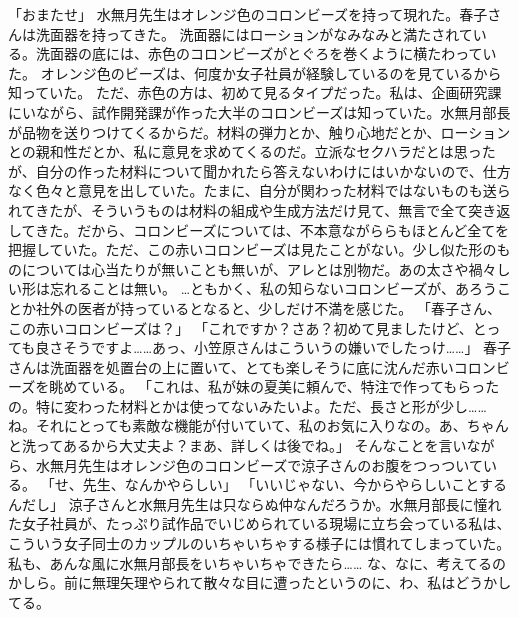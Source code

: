 「おまたせ」
水無月先生はオレンジ色のコロンビーズを持って現れた。春子さんは洗面器を持ってきた。
洗面器にはローションがなみなみと満たされている。洗面器の底には、赤色のコロンビーズがとぐろを巻くように横たわっていた。
オレンジ色のビーズは、何度か女子社員が経験しているのを見ているから知っていた。
ただ、赤色の方は、初めて見るタイプだった。私は、企画研究課にいながら、試作開発課が作った大半のコロンビーズは知っていた。水無月部長が品物を送りつけてくるからだ。材料の弾力とか、触り心地だとか、ローションとの親和性だとか、私に意見を求めてくるのだ。立派なセクハラだとは思ったが、自分の作った材料について聞かれたら答えないわけにはいかないので、仕方なく色々と意見を出していた。たまに、自分が関わった材料ではないものも送られてきたが、そういうものは材料の組成や生成方法だけ見て、無言で全て突き返してきた。だから、コロンビーズについては、不本意ながららもほとんど全てを把握していた。ただ、この赤いコロンビーズは見たことがない。少し似た形のものについては心当たりが無いことも無いが、アレとは別物だ。あの太さや禍々しい形は忘れることは無い。
…ともかく、私の知らないコロンビーズが、あろうことか社外の医者が持っているとなると、少しだけ不満を感じた。
「春子さん、この赤いコロンビーズは？」
「これですか？さあ？初めて見ましたけど、とっても良さそうですよ……あっ、小笠原さんはこういうの嫌いでしたっけ……」
春子さんは洗面器を処置台の上に置いて、とても楽しそうに底に沈んだ赤いコロンビーズを眺めている。
「これは、私が妹の夏美に頼んで、特注で作ってもらったの。特に変わった材料とかは使ってないみたいよ。ただ、長さと形が少し……ね。それにとっても素敵な機能が付いていて、私のお気に入りなの。あ、ちゃんと洗ってあるから大丈夫よ？まあ、詳しくは後でね。」
そんなことを言いながら、水無月先生はオレンジ色のコロンビーズで涼子さんのお腹をつっついている。
「せ、先生、なんかやらしい」
「いいじゃない、今からやらしいことするんだし」
涼子さんと水無月先生は只ならぬ仲なんだろうか。水無月部長に憧れた女子社員が、たっぷり試作品でいじめられている現場に立ち会っている私は、
こういう女子同士のカップルのいちゃいちゃする様子には慣れてしまっていた。私も、あんな風に水無月部長をいちゃいちゃできたら……
な、なに、考えてるのかしら。前に無理矢理やられて散々な目に遭ったというのに、わ、私はどうかしてる。

